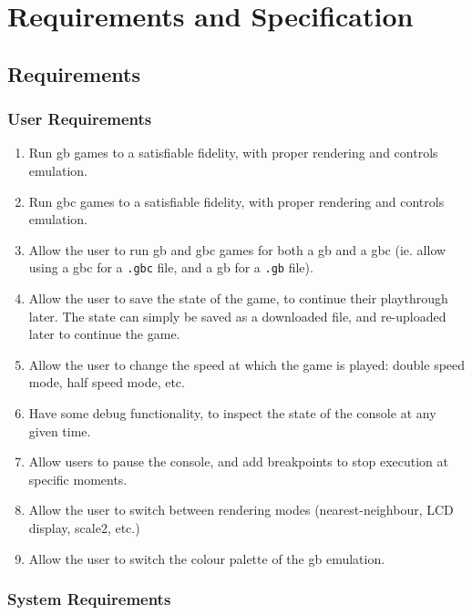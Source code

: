 \documentclass[11pt]{report}
\begin{document}
\chapter{Requirements and Specification}

\section{Requirements}

\subsection{User Requirements}

\begin{enumerate}[start=1,label=U\arabic*.]
    \item Run \glsdesc{gb} games to a satisfiable fidelity, with proper rendering and controls emulation.
    \item Run \glsdesc{gbc} games to a satisfiable fidelity, with proper rendering and controls emulation.
    \item Allow the user to run \gls{gb} and \gls{gbc} games for both a \glsdesc{gb} and a \glsdesc{gbc} (ie. allow using a \gls{gbc} for a \texttt{.gbc} file, and a \gls{gb} for a \texttt{.gb} file).
    \item Allow the user to save the state of the game, to continue their playthrough later. The state can simply be saved as a downloaded file, and re-uploaded later to continue the game.
    \item Allow the user to change the speed at which the game is played: double speed mode, half speed mode, etc.
    \item Have some debug functionality, to inspect the state of the console at any given time.
    \item Allow users to pause the console, and add breakpoints to stop execution at specific moments.
    \item Allow the user to switch between rendering modes (nearest-neighbour, LCD display, scale2, etc.)
    \item Allow the user to switch the colour palette of the \gls{gb} emulation.
\end{enumerate}

\subsection{System Requirements}
\end{document}
